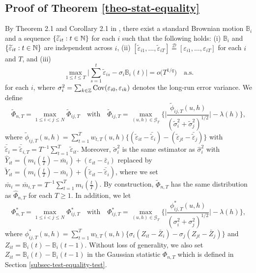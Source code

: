 \documentclass[a4paper,12pt]{article}
\begin{document}
\subsection*{Proof of Theorem \ref{theo-stat-equality}}


By Theorem 2.1 and Corollary 2.1 in \cite{BerkesLiuWu2014}, there exist a standard Brownian motion $\mathbb{B}_i$ and a sequence $\{ \widetilde{\varepsilon}_{it}: t \in \mathbb{N} \}$ for each $i$ such that the following holds: (i) $\mathbb{B}_i$ and $\{ \widetilde{\varepsilon}_{it}: t \in \mathbb{N} \}$ are independent across $i$, (ii) $[\widetilde{\varepsilon}_{i1},\ldots,\widetilde{\varepsilon}_{iT}] \stackrel{\mathcal{D}}{=} [\varepsilon_{i1},\ldots,\varepsilon_{iT}]$ for each $i$ and $T$, and (iii)  
\begin{equation*}
\max_{1 \le t \le T} \Big| \sum\limits_{s=1}^t \widetilde{\varepsilon}_{is} - \sigma_i \mathbb{B}_i(t) \Big| = o\big( T^{1/q} \big) \quad \text{a.s.}  
\end{equation*}
for each $i$, where $\sigma_i^2 = \sum_{k \in \mathbb{Z}} \textnormal{Cov}(\varepsilon_{i0}, \varepsilon_{ik})$ denotes the long-run error variance. We define 
\[ \widetilde{\Phi}_{n,T} = \max_{1\le i < j \le N} \widetilde{\Phi}_{ij,T} \quad \text{with} \quad \widetilde{\Phi}_{ij,T} = \max_{(u,h) \in \mathcal{G}_T} \Big\{ \Big|\frac{\widetilde{\phi}_{ij,T}(u,h)}{(\widetilde{\sigma}_i^2 + \widetilde{\sigma}_j^2)^{1/2}}\Big| - \lambda(h) \Big\}, \]
where $\widetilde{\phi}_{ij,T}(u,h) = \sum\nolimits_{t=1}^T w_{t,T}(u,h) \{ (\widetilde{\varepsilon}_{it} - \bar{\widetilde{\varepsilon}}_i) - (\widetilde{\varepsilon}_{jt} - \bar{\widetilde{\varepsilon}}_j) \}$ with $\bar{\widetilde{\varepsilon}}_i = \bar{\widetilde{\varepsilon}}_{i,T} = T^{-1} \sum_{t=1}^T \widetilde{\varepsilon}_{it}$. Moreover, $\widetilde{\sigma}_i^2$ is the same estimator as $\widehat{\sigma}_i^2$ with $\widehat{Y}_{it} = (m_i(\frac{t}{T}) - \bar{m}_i) + (\varepsilon_{it} - \bar{\varepsilon}_i)$ replaced by $\widetilde{Y}_{it} = (m_i(\frac{t}{T}) - \bar{m}_i) + (\widetilde{\varepsilon}_{it} - \bar{\widetilde{\varepsilon}}_i)$, where we set $\bar{m}_i = \bar{m}_{i,T} = T^{-1} \sum_{t=1}^T m_i(\frac{t}{T})$. By construction, $\widetilde{\Phi}_{n,T}$ has the same distribution as $\widehat{\Phi}_{n,T}$ for each $T \ge 1$. In addition, we let 
\[ \Phi_{n,T}^* = \max_{1\le i < j \le N} \Phi_{ij,T}^* \quad \text{with} \quad \Phi_{ij,T}^* = \max_{(u,h) \in \mathcal{G}_T} \Big\{ \Big|\frac{\phi_{ij,T}^*(u,h)}{(\sigma_i^2 + \sigma_j^2)^{1/2}}\Big| - \lambda(h) \Big\}, \] 
where $\phi_{ij,T}^*(u,h) = \sum\nolimits_{t=1}^T w_{t,T}(u,h) \{ \sigma_i (Z_{it} - \bar{Z}_i) - \sigma_j (Z_{jt} - \bar{Z}_j) \}$ and $Z_{it} = \mathbb{B}_i(t) - \mathbb{B}_i(t-1)$. Without loss of generality, we also set $Z_{it} = \mathbb{B}_i(t) - \mathbb{B}_i(t-1)$ in the Gaussian statistic $\Phi_{n,T}$ which is defined in Section \ref{subsec-test-equality-test}. 
\end{document}

